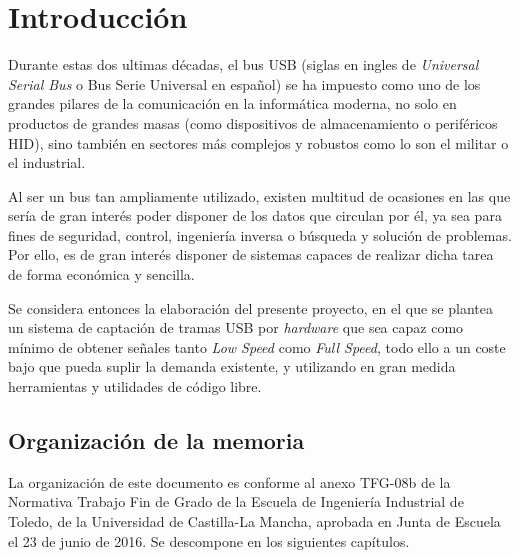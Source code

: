\chapter{Introducción} 
\label{ch:introduccion}

Durante estas dos ultimas décadas, el bus USB\cite{specification2000revision} (siglas en ingles de \emph{Universal Serial Bus} o Bus Serie Universal en español) se ha impuesto como uno de los grandes pilares de la comunicación en la informática moderna, no solo en productos de grandes masas (como dispositivos de almacenamiento o periféricos HID\cite{usb:hid}), sino también en sectores más complejos y robustos como lo son el militar o el industrial.

Al ser un bus tan ampliamente utilizado, existen multitud de ocasiones en las que sería de gran interés poder disponer de los datos que circulan por él, ya sea para fines de seguridad\cite{NISSIM2017675}, control, ingeniería inversa o búsqueda y solución de problemas. Por ello, es de gran interés disponer de sistemas capaces de realizar dicha tarea de forma económica y sencilla.


Se considera entonces la elaboración del presente proyecto, en el que se plantea un sistema de captación de tramas USB por \textit{hardware} que sea capaz como mínimo de obtener señales tanto \textit{Low Speed} como \textit{Full Speed}, todo ello a un coste bajo que pueda suplir la demanda existente, y utilizando en gran medida herramientas y utilidades de código libre.

\section{Organización de la memoria} 
La organización de este documento es conforme al anexo TFG-08b\cite{tfg08b} de la Normativa Trabajo Fin de Grado de la Escuela de Ingeniería Industrial de Toledo, de la Universidad de Castilla-La Mancha, aprobada en Junta de Escuela el 23 de junio de 2016. Se descompone en los siguientes capítulos.

